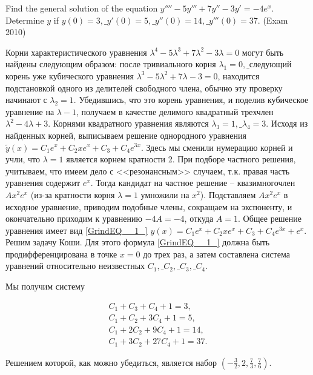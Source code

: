 \begin{problem}
Find the general solution of the equation $y''''-5y'''+7y''-3y'=-4e^{x} $. Determine $y$ if $y(0)=3,\_ y'(0)=5,\_ y''(0)=14,\_ y'''(0)=37.$ (Exam 2010)
\end{problem}

\begin{solution}
Корни характеристического уравнения $\lambda ^{4} -5\lambda ^{3} +7\lambda ^{2} -3\lambda =0$ могут быть найдены следующим образом: после тривиального корня $\lambda _{1} =0,\_ $следующий корень уже кубического уравнения $\lambda ^{3} -5\lambda ^{2} +7\lambda -3=0$, находится подстановкой одного из делителей свободного члена, обычно эту проверку начинают с $\lambda _{2} =1$. Убедившись, что это корень уравнения, и поделив кубическое уравнение на $\lambda -1$, получаем в качестве делимого квадратный трехчлен $\lambda ^{2} -4\lambda +3$. Корнями квадратного уравнения являются $\lambda _{3} =1,\_ \lambda _{4} =3$. Исходя из найденных корней, выписываем решение однородного уравнения $\tilde{y}(x)=C_{1} e^{x} +C_{2} xe^{x} +C_{3} +C_{4} e^{3x} $. Здесь мы сменили нумерацию корней и учли, что $\lambda =1$ является корнем кратности 2. При подборе частного решения, учитываем, что имеем дело с <<резонансным>> случаем, т.к. правая часть уравнения  содержит $e^{x} $. Тогда кандидат на частное решение -- квазимногочлен $Ax^{2} e^{x} $ (из-за кратности корня $\lambda =1$ умножили на $x^{2} $). Подставляем $Ax^{2} e^{x} $ в исходное уравнение, приводим подобные члены, сокращаем на экспоненту, и окончательно приходим к уравнению $-4A=-4$, откуда $A=1$. Общее решение уравнения  имеет вид \eqref{GrindEQ__1_} $y(x)=C_{1} e^{x} +C_{2} xe^{x} +C_{3} +C_{4} e^{3x} +e^{x} $. Решим задачу Коши. Для этого формула \eqref{GrindEQ__1_} должна быть продифференцирована в точке $x=0$ до трех раз, а затем составлена система уравнений относительно неизвестных $C_{1} ,\_ C_{2} ,\_ C_{3} ,\_ C_{4} $.

Мы получим систему

\[\begin{array}{c} {C_{1} +C_{3} +C_{4} +1=3,} \\ {C_{1} +C_{2} +3C_{4} +1=5,} \\ {C_{1} +2C_{2} +9C_{4} +1=14,} \\ {C_{1} +3C_{2} +27C_{4} +1=37.} \end{array}\] 

Решением которой, как можно убедиться, является набор $(-\frac{3}{2} ,2,\frac{7}{3} ,\frac{7}{6} )$.
\end{solution}

